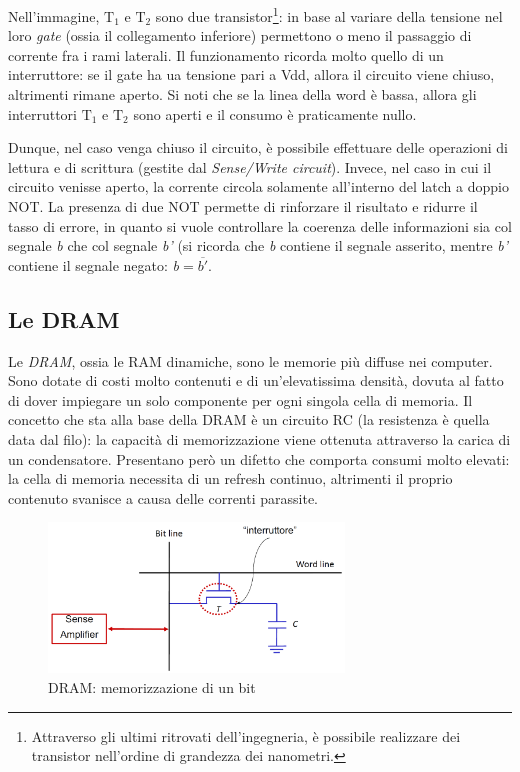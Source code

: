 \documentclass[class=book, crop=false, oneside]{standalone}
\begin{document}
Nell'immagine, \(\textrm{T}_1\) e \(\textrm{T}_2\) sono due transistor\footnote{Attraverso gli ultimi ritrovati dell'ingegneria, è possibile realizzare dei transistor nell'ordine di grandezza dei nanometri.}: in base al variare della tensione nel loro \emph{gate} (ossia il collegamento inferiore) permettono o meno il passaggio di corrente fra i rami laterali. Il funzionamento ricorda molto quello di un interruttore: se il gate ha ua tensione pari a Vdd, allora il circuito viene chiuso, altrimenti rimane aperto. Si noti che se la linea della word è bassa, allora gli interruttori \(\textrm{T}_1\) e \(\textrm{T}_2\) sono aperti e il consumo è praticamente nullo.

Dunque, nel caso venga chiuso il circuito, è possibile effettuare delle operazioni di lettura e di scrittura (gestite dal \emph{Sense/Write circuit}). Invece, nel caso in cui il circuito venisse aperto, la corrente circola solamente all'interno del latch a doppio NOT. La presenza di due NOT permette di rinforzare il risultato e ridurre il tasso di errore, in quanto si vuole controllare la coerenza delle informazioni sia col segnale \emph{b} che col segnale \emph{b'} (si ricorda che \emph{b} contiene il segnale asserito, mentre \emph{b'} contiene il segnale negato: \emph{b}\(=\)\emph{\(\overline{b'}\)}.

\subsection{Le DRAM}
Le \emph{DRAM}, ossia le RAM dinamiche, sono le memorie più diffuse nei computer. Sono dotate di costi molto contenuti e di un'elevatissima densità, dovuta al fatto di dover impiegare un solo componente per ogni singola cella di memoria. Il concetto che sta alla base della DRAM è un circuito RC (la resistenza è quella data dal filo): la capacità di memorizzazione viene ottenuta attraverso la carica di un condensatore. Presentano però un difetto che comporta consumi molto elevati: la cella di memoria necessita di un refresh continuo, altrimenti il proprio contenuto svanisce a causa delle correnti parassite.

\begin{figure}[H]
	\centering
	\includegraphics[width=0.7\textwidth,keepaspectratio]{cella_DRAM.png}
	\caption{DRAM: memorizzazione di un bit}
\end{figure}
\end{document}
